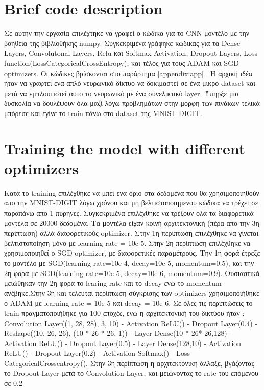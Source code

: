 \section{Brief code description}

Σε αυτην την εργασία επιλέχτηκε να γραφεί ο κώδικα για το CNN μοντέλο με την βοήθεια της βιβλιοθήκης numpy.  Συγκεκριμένα γράφηκε κώδικας για τα Dense Layers, Convolutonal Layers, Relu και Softmax Activation, Dropout Layers, Loss function(LossCategoricalCrossEntropy), και τέλος για τους ADAM και SGD optimizers. Οι κώδικες βρίσκονται στο παράρτημα \ref{appendix:app} . Η αρχική ιδέα ήταν να γραφτεί ενα απλό νευρωνικό δίκτυο να δοκιμαστεί σε ένα μικρό dataset και μετά να εμπλουτιστεί αυτο το νευρωνικό με ένα συνελικτικό layer. Υπήρξε μία δυσκολία να δουλέψουν όλα μαζί λόγω προβλημάτων στην μορφη των πινάκων τελικά μπόρεσε και εγίνε το train πάνω στο dataset της MNIST-DIGIT.

\section{Training the model with different optimizers}

Κατά το training επιλέχθηκε να μπεί ενα όριο στα δεδομένα που θα χρησιμοποιηθούν απο την MNIST-DIGIT λόγω χρόνου και μη βελτιστοποιημενου κώδικα να τρέχει σε παραπάνω απο 1 πυρήνες. Συγκεκριμένα επιλέχθηκε να τρέξουν όλα τα διαφορετικά μοντέλα σε $20000$ δεδομένα. Τα μοντέλα είχαν κοινή αρχιτεκτονική (πέρα απο την 3η περίπτωση) αλλά διαφορετικούς optimizer. Στην 1η περίπτωση επιλέχθηκε να γίνεται βελτιστοποίηση μόνο με learning rate = 10e-5. Στην 2η περίπτωση επιλέχθηκε να χρησιμοποιηθεί ο SGD optimizer, με διαφορετικές παραμέτρους. Την 1η φορά έτρεξε το μοντέλο με SGD(learning rate=10e-4, decay=10e-5, momentum=0.5), και την 2η φορά με SGD(learning rate=10e-5, decay=10e-6, momentum=0.9).
Ουσιαστικά μειώθηκαν την 2η φορά το learing rate και το decay ενώ το momentum ανέβηκε.Στην 3ή και τελευταί περίπτωση σύγκρισης των optimizers 
χρησιμοποιήθηκε ο ADAM με learning rate = 10e-5 και decay = 10e-6. Σε όλες τις περιπτώσεις το train πραγματοποιήθηκε για 100 εποχές, ενώ η αρχιτεκτονική του δικτύου ήταν : Convolution Layer((1, 28, 28), 3, 10) - Activation ReLU() - Dropout Layer(0.4) - Reshape((10, 26, 26), (10 * 26 * 26, 1)) - Layer Dense(10 * 26* 26,128) - Activation ReLU() - Dropout Layer(0.5) - Layer Dense(128,10) - Activation ReLU() - Dropout Layer(0.2) - Activation Softmax() - Loss CategoricalCrossentropy(). Στην 3η περίπτωση η αρχιτεκτόνικη άλλαξε, βγάζοντας το Dropout Layer μετά το Convolution Layer, και μειώνοντας το rate του επόμενου σε 0.2


